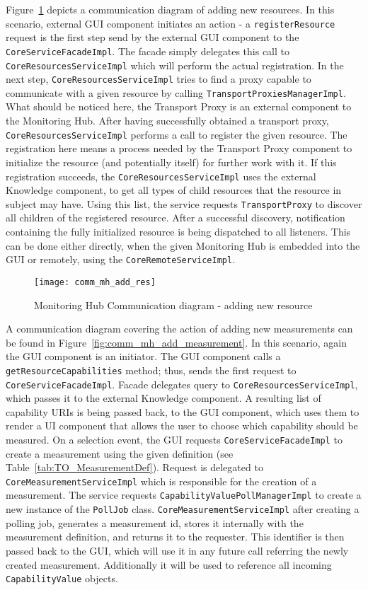 Figure~\ref{fig:comm_mh_add_res} depicts a communication diagram of adding new resources. In this scenario, external GUI component initiates an action - a \texttt{registerResource} request is the first step send by the external GUI component to the \texttt{CoreServiceFacadeImpl}. The facade simply delegates this call to \texttt{CoreResourcesServiceImpl} which will perform the actual registration. In the next step, \texttt{CoreResourcesServiceImpl} tries to find a proxy capable to communicate with a given resource by calling \texttt{TransportProxiesManagerImpl}. What should be noticed here, the Transport Proxy is an external component to the Monitoring Hub. After having successfully obtained a transport proxy, \texttt{CoreResourcesServiceImpl} performs a call to register the given resource. The registration here means a process needed by the Transport Proxy component to initialize the resource (and potentially itself) for further work with it. If this registration succeeds, the \texttt{CoreResourcesServiceImpl} uses the external Knowledge component, to get all types of child resources that the resource in subject may have. Using this list, the service requests \texttt{TransportProxy} to discover all children of the registered resource. After a successful discovery, notification containing the fully initialized resource is being dispatched to all listeners. This can be done either directly, when the given Monitoring Hub is embedded into the GUI or remotely, using the \texttt{CoreRemoteServiceImpl}.

\begin{figure}[ht]
\centering
\texttt{[image: comm\_mh\_add\_res]}
\caption{Monitoring Hub Communication diagram - adding new resource}
\label{fig:comm_mh_add_res}
\end{figure}

A communication diagram covering the action of adding new measurements can be found in Figure~\ref{fig:comm_mh_add_measurement}. In this scenario, again the GUI component is an initiator. The GUI component calls a \texttt{getResourceCapabilities} method; thus, sends the first request to \texttt{CoreServiceFacadeImpl}. Facade delegates query to \texttt{CoreResourcesServiceImpl}, which passes it to the external Knowledge component. A resulting list of capability URIs is being passed back, to the GUI component, which uses them to render a UI component that allows the user to choose which capability should be measured. On a selection event, the GUI requests \texttt{CoreServiceFacadeImpl} to create a measurement using the given definition (see Table~\ref{tab:TO_MeasurementDef}). Request is delegated to \texttt{CoreMeasurementServiceImpl} which is responsible for the creation of a measurement. The service requests \texttt{CapabilityValuePollManagerImpl} to create a new instance of the \texttt{PollJob} class. \texttt{CoreMeasurementServiceImpl} after creating a polling job, generates a measurement id, stores it internally with the measurement definition, and returns it to the requester. This identifier is then passed back to the GUI, which will use it in any future call referring the newly created measurement. Additionally it will be used to reference all incoming \texttt{CapabilityValue} objects.

